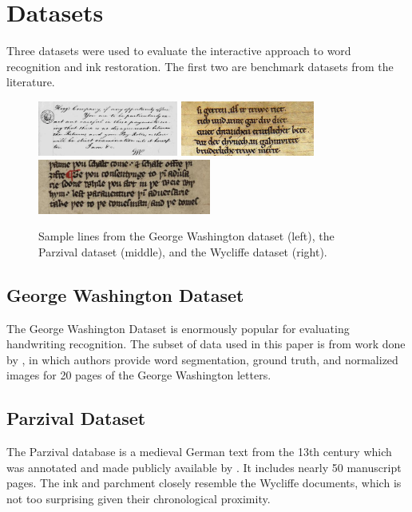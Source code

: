 \documentclass[final]{ukthesis}
\begin{document}
%
%
\section{Datasets}
Three datasets were used to evaluate the interactive approach to word recognition and ink restoration. The first two are benchmark datasets from the literature.


\begin{figure}[t]
\begin{center}
\includegraphics[height=1.8cm]{gw-sample}
\includegraphics[height=1.8cm]{parzival-sample}
\includegraphics[height=1.8cm]{wycliffe-sample}
\end{center}
\caption{Sample lines from the George Washington dataset (left), the Parzival dataset (middle), and the Wycliffe dataset (right).}
\label{fig:dataset-samples}
\end{figure}


\subsection{George Washington Dataset}
The George Washington Dataset is enormously popular for evaluating handwriting recognition. The subset of data used in this paper is from work done by \cite{fischer2012lexicon}, in which authors provide word segmentation, ground truth, and normalized images for 20 pages of the George Washington letters.

\subsection{Parzival Dataset}
The Parzival database is a medieval German text from the 13th century which was annotated and made publicly available by \cite{fischer2010ground}. It includes nearly 50 manuscript pages. The ink and parchment closely resemble the Wycliffe documents, which is not too surprising given their chronological proximity.
\end{document}
